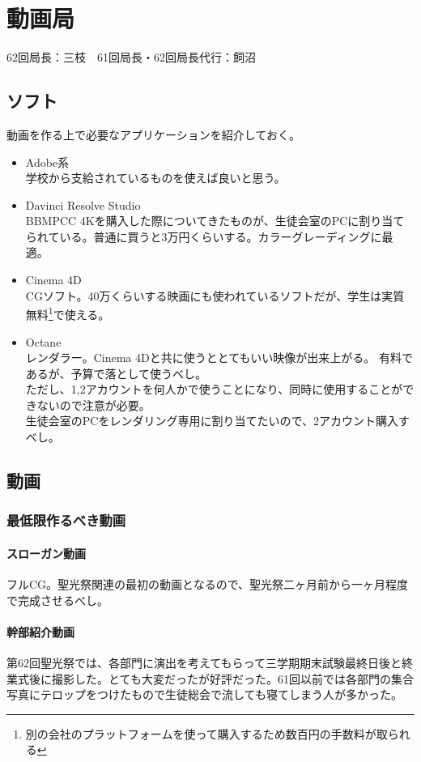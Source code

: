 \documentclass[dvipdfmx,jb5]{jreport}
\newcommand{\Chapter}[1]{\chapter{#1}\thispagestyle{fancy}}
\begin{document}
\Chapter{動画局}
62回局長：三枝　61回局長・62回局長代行：飼沼
\section{ソフト}
動画を作る上で必要なアプリケーションを紹介しておく。
\begin{itemize}
      \item Adobe系\\
            学校から支給されているものを使えば良いと思う。
      \item Davinci Resolve Studio\\
            BBMPCC 4Kを購入した際についてきたものが、生徒会室のPCに割り当てられている。普通に買うと3万円くらいする。カラーグレーディングに最適。
      \item Cinema 4D\\
            CGソフト。40万くらいする映画にも使われているソフトだが、学生は実質無料\footnote{別の会社のプラットフォームを使って購入するため数百円の手数料が取られる}で使える。
      \item Octane\\
            レンダラー。Cinema 4Dと共に使うととてもいい映像が出来上がる。
            有料であるが、予算で落として使うべし。\\ただし、1,2アカウントを何人かで使うことになり、同時に使用することができないので注意が必要。\\生徒会室のPCをレンダリング専用に割り当てたいので、2アカウント購入すべし。
\end{itemize}
\newpage
\section{動画}
\subsection{最低限作るべき動画}
\subsubsection{スローガン動画}
フルCG。聖光祭関連の最初の動画となるので、聖光祭二ヶ月前から一ヶ月程度で完成させるべし。
\subsubsection{幹部紹介動画}
第62回聖光祭では、各部門に演出を考えてもらって三学期期末試験最終日後と終業式後に撮影した。とても大変だったが好評だった。61回以前では各部門の集合写真にテロップをつけたもので生徒総会で流しても寝てしまう人が多かった。
\end{document}
